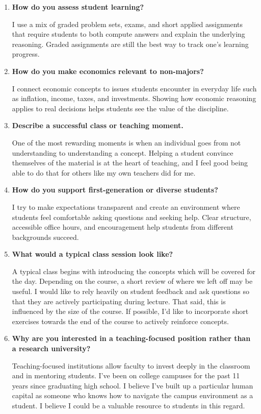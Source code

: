\documentclass{scrartcl}
\begin{document}
\begin{enumerate}
\item \textbf{How do you assess student learning?}

  I use a mix of graded problem sets, exams, and short applied assignments that require students to both compute answers and explain the underlying reasoning. Graded assignments are still the best way to track one's learning progress.
  
\item \textbf{How do you make economics relevant to non-majors?}

I connect economic concepts to issues students encounter in everyday life such as inflation, income, taxes, and investments. Showing how economic reasoning applies to real decisions helps students see the value of the discipline.

\item \textbf{Describe a successful class or teaching moment.}

One of the most rewarding moments is when an individual goes from not understanding to understanding a concept. Helping a student convince themselves of the material is at the heart of teaching, and I feel good being able to do that for others like my own teachers did for me. 

\item \textbf{How do you support first-generation or diverse students?}

I try to make expectations transparent and create an environment where students feel comfortable asking questions and seeking help. Clear structure, accessible office hours, and encouragement help students from different backgrounds succeed.

\item \textbf{What would a typical class session look like?}

A typical class begins with introducing the concepts which will be covered for the day. Depending on the course, a short review of where we left off may be useful. I would like to rely heavily on student feedback and ask questions so that they are actively participating during lecture. That said, this is influenced by the size of the course. If possible, I'd like to incorporate short exercises towards the end of the course to actively reinforce concepts. 

\item \textbf{Why are you interested in a teaching-focused position rather than a research university?}

Teaching-focused institutions allow faculty to invest deeply in the classroom and in mentoring students. I've been on college campuses for the past 11 years since graduating high school. I believe I've built up a particular human capital as someone who knows how to navigate the campus environment as a student. I believe I could be a valuable resource to students in this regard. 

\end{enumerate}
\end{document}
